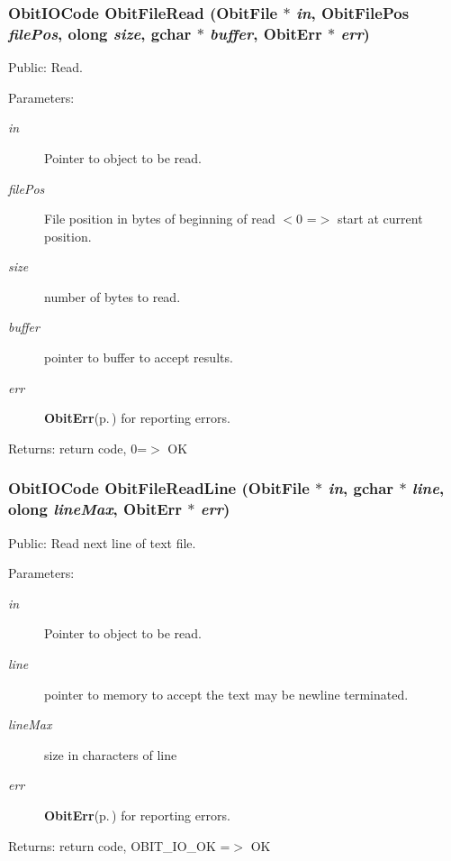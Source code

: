 \subsubsection{\setlength{\rightskip}{0pt plus 5cm}Obit\-IOCode Obit\-File\-Read ({\bf Obit\-File} $\ast$ {\em in}, {\bf Obit\-File\-Pos} {\em file\-Pos}, {\bf olong} {\em size}, gchar $\ast$ {\em buffer}, {\bf Obit\-Err} $\ast$ {\em err})}\label{ObitFile_8c_a19}


Public: Read. 

\begin{Desc}
\item[Parameters:]
\begin{description}
\item[{\em in}]Pointer to object to be read. \item[{\em file\-Pos}]File position in bytes of beginning of read $<$0 =$>$ start at current position. \item[{\em size}]number of bytes to read. \item[{\em buffer}]pointer to buffer to accept results. \item[{\em err}]{\bf Obit\-Err}{\rm (p.\,\pageref{structObitErr})} for reporting errors. \end{description}
\end{Desc}
\begin{Desc}
\item[Returns:]return code, 0=$>$ OK \end{Desc}
\subsubsection{\setlength{\rightskip}{0pt plus 5cm}Obit\-IOCode Obit\-File\-Read\-Line ({\bf Obit\-File} $\ast$ {\em in}, gchar $\ast$ {\em line}, {\bf olong} {\em line\-Max}, {\bf Obit\-Err} $\ast$ {\em err})}\label{ObitFile_8c_a20}


Public: Read next line of text file. 

\begin{Desc}
\item[Parameters:]
\begin{description}
\item[{\em in}]Pointer to object to be read. \item[{\em line}]pointer to memory to accept the text may be newline terminated. \item[{\em line\-Max}]size in characters of line \item[{\em err}]{\bf Obit\-Err}{\rm (p.\,\pageref{structObitErr})} for reporting errors. \end{description}
\end{Desc}
\begin{Desc}
\item[Returns:]return code, OBIT\_\-IO\_\-OK =$>$ OK \end{Desc}
